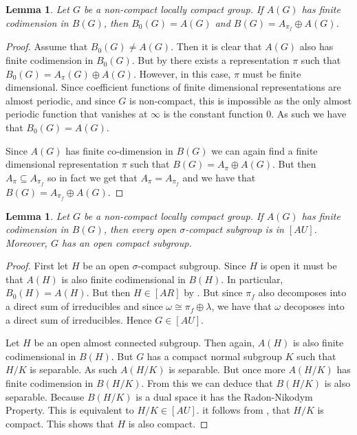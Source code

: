 \documentclass[10pt]{amsart}
\newtheorem{lem}[thm]{Lemma}
\numberwithin{thm}{section}
\numberwithin{equation}{section}
\begin{document}
\begin{lem}\label{L:co-dim-IN}
Let $G$ be a non-compact locally compact group. If $A(G)$ has finite codimension in $B(G)$, then 
$B_0(G)=A(G)$ and $B(G)=A_{\pi _f}\oplus A(G)$.
\end{lem}

\begin{proof}
Assume that $B_0(G)\not=A(G)$. Then it is clear that $A(G)$ also has finite
codimension in $B_0(G)$. But by \cite{Arsac} there exists 
a representation $\pi $ such that $B_0(G)=A_\pi(G)\oplus A(G)$. However, 
in this case, $\pi $ must be finite dimensional. Since coefficient 
functions of finite dimensional representations are almost periodic, and 
since $G$ is non-compact, 
this is impossible as the only almost periodic function that vanishes 
at $\infty$ is the constant function $0$. As such we have that $B_0(G)=A(G)$.

Since $A(G)$ has finite co-dimension in $B(G)$ we can again find a finite dimensional representation 
$\pi $ such that $B(G)=A_\pi \oplus A(G)$. But then $A_{\pi}\subseteq A_{\pi _f}$ so in fact we get that 
$A_{\pi}=A_{\pi _f}$ and we have that $B(G)=A_{\pi _f}\oplus A(G)$.
\end{proof} 

\begin{lem}\label{L:co-dim-sigma-compact}
Let $G$ be a non-compact locally compact group. If $A(G)$ has finite codimension in $B(G)$, then 
every open $\sigma $-compact subgroup is in $[AU]$. Moreover, $G$ has an open compact subgroup. 
\end{lem}

\begin{proof}
First let $H$ be an open $\sigma $-compact subgroup. Since $H$ is open it must be that $A(H)$ is also 
finite codimensional in $B(H)$. In particular, $B_0(H)=A(H)$. But then $H\in[AR]$ 
by \cite[Theorem 16]{BelFor}. But since $\pi _f$ also decomposes into a direct sum of irreducibles and 
since $\omega \cong  \pi_f \oplus \lambda$, we have that $\omega $ decoposes into a direct 
sum of irreducibles.  Hence $G\in[AU]$.

Let $H$ be an open almost connected subgroup. Then again, $A(H)$ is also 
finite codimensional in $B(H)$. But $G$ has a compact normal subgroup $K$ such that $H/K$ is separable.
As such $A(H/K)$ is separable. But once more $A(H/K)$ has finite codimension in $B(H/K)$. From this we 
can deduce that $B(H/K)$ is also separable. Because $B(H/K)$ is a dual space it has the 
Radon-Nikodym Property. This is equivalent to $H/K\in[AU]$. it follows from \cite[Theorem 4.11]{Taylor}, 
that $H/K$ is compact. This shows that $H$ is also compact. 
  
\end{proof}
\end{document}
